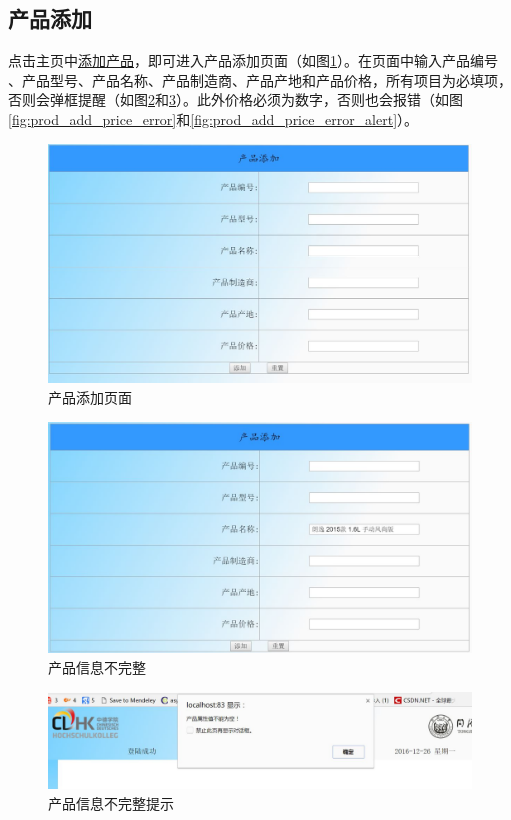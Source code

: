 \subsection{产品添加}
点击主页中\underline{添加产品}，即可进入产品添加页面（如图\ref{fig:prod_add_index}）。在页面中输入产品编号	 、产品型号、产品名称、产品制造商、产品产地和产品价格，所有项目为必填项，否则会弹框提醒（如图\ref{fig:error_noComplete}和\ref{fig:error_noComplete_alert}）。此外价格必须为数字，否则也会报错（如图\ref{fig:prod_add_price_error}和\ref{fig:prod_add_price_error_alert}）。
\begin{figure}[H]
\centering
\includegraphics[width=0.8\linewidth]{figure/prod_add_index}
\caption{产品添加页面}
\label{fig:prod_add_index}
\end{figure}

\begin{figure}[H]
\centering
\includegraphics[width=0.8\linewidth]{figure/error_noComplete}
\caption{产品信息不完整}
\label{fig:error_noComplete}
\end{figure}

\begin{figure}[H]
\centering
\includegraphics[width=0.8\linewidth]{figure/error_noComplete_alert}
\caption{产品信息不完整提示}
\label{fig:error_noComplete_alert}
\end{figure}

